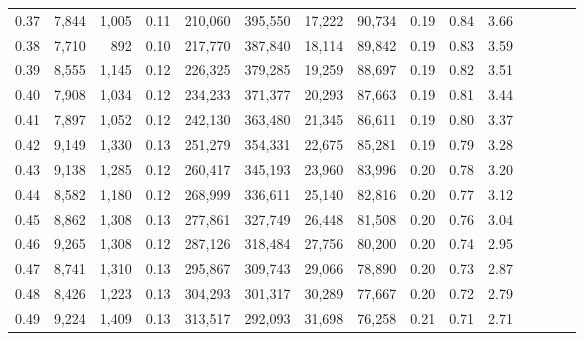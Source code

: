 \begin{tabular}{rrrcrrrrrrrrrrr}
0.37 &   7,844 &  1,005 &                                       0.11 &  210,060 &  395,550 &   17,222 &   90,734 &  0.19 &  0.84 &                         3.66 \\
0.38 &   7,710 &    892 &                                       0.10 &  217,770 &  387,840 &   18,114 &   89,842 &  0.19 &  0.83 &                         3.59 \\
0.39 &   8,555 &  1,145 &                                       0.12 &  226,325 &  379,285 &   19,259 &   88,697 &  0.19 &  0.82 &                         3.51 \\
0.40 &   7,908 &  1,034 &                                       0.12 &  234,233 &  371,377 &   20,293 &   87,663 &  0.19 &  0.81 &                         3.44 \\
0.41 &   7,897 &  1,052 &                                       0.12 &  242,130 &  363,480 &   21,345 &   86,611 &  0.19 &  0.80 &                         3.37 \\
0.42 &   9,149 &  1,330 &                                       0.13 &  251,279 &  354,331 &   22,675 &   85,281 &  0.19 &  0.79 &                         3.28 \\
0.43 &   9,138 &  1,285 &                                       0.12 &  260,417 &  345,193 &   23,960 &   83,996 &  0.20 &  0.78 &                         3.20 \\
0.44 &   8,582 &  1,180 &                                       0.12 &  268,999 &  336,611 &   25,140 &   82,816 &  0.20 &  0.77 &                         3.12 \\
0.45 &   8,862 &  1,308 &                                       0.13 &  277,861 &  327,749 &   26,448 &   81,508 &  0.20 &  0.76 &                         3.04 \\
0.46 &   9,265 &  1,308 &                                       0.12 &  287,126 &  318,484 &   27,756 &   80,200 &  0.20 &  0.74 &                         2.95 \\
0.47 &   8,741 &  1,310 &                                       0.13 &  295,867 &  309,743 &   29,066 &   78,890 &  0.20 &  0.73 &                         2.87 \\
0.48 &   8,426 &  1,223 &                                       0.13 &  304,293 &  301,317 &   30,289 &   77,667 &  0.20 &  0.72 &                         2.79 \\
0.49 &   9,224 &  1,409 &                                       0.13 &  313,517 &  292,093 &   31,698 &   76,258 &  0.21 &  0.71 &                         2.71 \\

\end{tabular}
